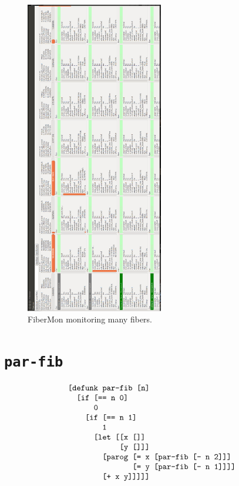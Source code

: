 \begin{figure}[bth]
  \center
  \includegraphics[width=6cm]{gfx/fibermon_many_fibers}
  \caption[FiberMon monitoring many fibers]{FiberMon monitoring many fibers.}
  \label{figure:fibermon_many_fibers}
\end{figure}


\section{{\tt par-fib}}

\begin{equation*}
\begin{array}{l}
\text{\tt [defunk par-fib [n]} \\
\text{\tt ~~[if [== n 0]} \\
\text{\tt ~~~~~~0} \\
\text{\tt ~~~~[if [== n 1]} \\
\text{\tt ~~~~~~~~1} \\
\text{\tt ~~~~~~[let [[x []]} \\
\text{\tt ~~~~~~~~~~~~[y []]]} \\
\text{\tt ~~~~~~~~[parog [= x [par-fib [- n 2]]]} \\
\text{\tt ~~~~~~~~~~~~~~~[= y [par-fib [- n 1]]]]} \\
\text{\tt ~~~~~~~~[+ x y]]]]]}
\end{array}
\end{equation*}


